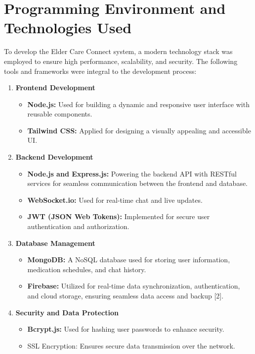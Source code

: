 \section{Programming Environment and Technologies Used}
To develop the Elder Care Connect system, a modern technology stack was employed to ensure high performance, scalability, and security. The following tools and frameworks were integral to the development process:
\begin{enumerate}
    \item \textbf{Frontend Development}
        \begin{itemize}
            \item \textbf{Node.js:} Used for building a dynamic and responsive user interface with reusable components.
            \item \textbf{Tailwind CSS:} Applied for designing a visually appealing and accessible UI.
        \end{itemize}
    \item \textbf{Backend Development}
        \begin{itemize}
            \item \textbf{Node.js and Express.js:} Powering the backend API with RESTful services for seamless communication between the frontend and database.
            \item \textbf{WebSocket.io:} Used for real-time chat and live updates.
            \item \textbf{JWT (JSON Web Tokens):} Implemented for secure user authentication and authorization.
        \end{itemize}
    \item \textbf{Database Management}
    \begin{itemize}
        \item \textbf{MongoDB:} A NoSQL database used for storing user information, medication schedules, and chat history.
        \item \textbf{Firebase:} Utilized for real-time data synchronization, authentication, and cloud storage, ensuring seamless data access and backup [2].
    \end{itemize}
    \item \textbf{Security and Data Protection}
        \begin{itemize}
            \item \textbf{Bcrypt.js:} Used for hashing user passwords to enhance security.
            \item SSL Encryption: Ensures secure data transmission over the network.
        \end{itemize}
\end{enumerate}

